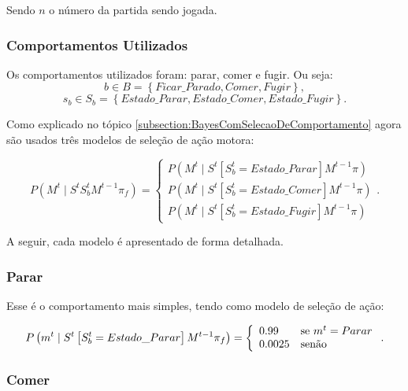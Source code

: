 Sendo $ n $ o número da partida sendo jogada.

\subsubsection{Comportamentos Utilizados} \label{subsubsection:3ComportamentosUtilizados}

Os comportamentos utilizados foram: parar, comer e fugir. Ou seja:
$$ b \in B = \left\{ Ficar\_Parado, Comer, Fugir \right\}, $$
$$ s_b \in S_b = \left\{ Estado\_Parar, Estado\_Comer, Estado\_Fugir \right\}. $$

Como explicado no tópico \ref{subsection:BayesComSelecaoDeComportamento} agora são usados três modelos de seleção de ação motora: 

\begin{equation}
    P \left( M^t \mid S^t S_b^t M^{t-1} \pi_f \right) = 
        \left\{
            \begin{array}{l}
                P \left( M^t \mid S^t \left[ S_b^t=Estado\_Parar \right] M^{t-1} \pi \right) \\
                P \left( M^t \mid S^t \left[ S_b^t=Estado\_Comer \right] M^{t-1} \pi \right) \\
                P \left( M^t \mid S^t \left[ S_b^t=Estado\_Fugir \right] M^{t-1} \pi \right)
            \end{array}
        \right..
\end{equation}

A seguir, cada modelo é apresentado de forma detalhada.

\subsubsection*{Parar}

Esse é o comportamento mais simples, tendo como modelo de seleção de ação:

\begin{equation}
    P \left( m^t \mid S^t \left[ S_b^t = Estado\_Parar \right] M^{t-1} \pi_f \right) = 
        \left\{
            \begin{array}{l l}
                0.99 & \text{se }m^t = Parar \\
                0.0025 & \text{senão}
            \end{array}
        \right..
\end{equation}

\subsubsection*{Comer}

